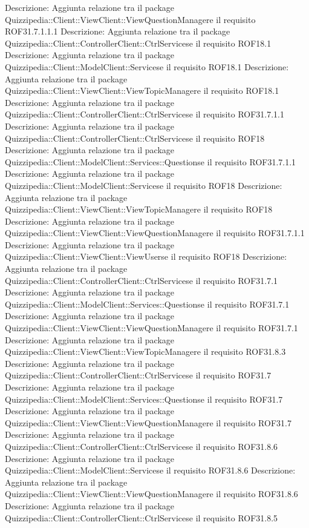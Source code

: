 Descrizione: Aggiunta relazione tra il package Quizzipedia::Client::ViewClient::ViewQuestionManagere il requisito ROF31.7.1.1.1 
Descrizione: Aggiunta relazione tra il package Quizzipedia::Client::ControllerClient::CtrlServicese il requisito ROF18.1 
Descrizione: Aggiunta relazione tra il package Quizzipedia::Client::ModelClient::Servicese il requisito ROF18.1 
Descrizione: Aggiunta relazione tra il package Quizzipedia::Client::ViewClient::ViewTopicManagere il requisito ROF18.1 
Descrizione: Aggiunta relazione tra il package Quizzipedia::Client::ControllerClient::CtrlServicese il requisito ROF31.7.1.1 
Descrizione: Aggiunta relazione tra il package Quizzipedia::Client::ControllerClient::CtrlServicese il requisito ROF18 
Descrizione: Aggiunta relazione tra il package Quizzipedia::Client::ModelClient::Services::Questionse il requisito ROF31.7.1.1 
Descrizione: Aggiunta relazione tra il package Quizzipedia::Client::ModelClient::Servicese il requisito ROF18 
Descrizione: Aggiunta relazione tra il package Quizzipedia::Client::ViewClient::ViewTopicManagere il requisito ROF18 
Descrizione: Aggiunta relazione tra il package Quizzipedia::Client::ViewClient::ViewQuestionManagere il requisito ROF31.7.1.1 
Descrizione: Aggiunta relazione tra il package Quizzipedia::Client::ViewClient::ViewUserse il requisito ROF18 
Descrizione: Aggiunta relazione tra il package Quizzipedia::Client::ControllerClient::CtrlServicese il requisito ROF31.7.1 
Descrizione: Aggiunta relazione tra il package Quizzipedia::Client::ModelClient::Services::Questionse il requisito ROF31.7.1 
Descrizione: Aggiunta relazione tra il package Quizzipedia::Client::ViewClient::ViewQuestionManagere il requisito ROF31.7.1 
Descrizione: Aggiunta relazione tra il package Quizzipedia::Client::ViewClient::ViewTopicManagere il requisito ROF31.8.3 
Descrizione: Aggiunta relazione tra il package Quizzipedia::Client::ControllerClient::CtrlServicese il requisito ROF31.7 
Descrizione: Aggiunta relazione tra il package Quizzipedia::Client::ModelClient::Services::Questionse il requisito ROF31.7 
Descrizione: Aggiunta relazione tra il package Quizzipedia::Client::ViewClient::ViewQuestionManagere il requisito ROF31.7 
Descrizione: Aggiunta relazione tra il package Quizzipedia::Client::ControllerClient::CtrlServicese il requisito ROF31.8.6 
Descrizione: Aggiunta relazione tra il package Quizzipedia::Client::ModelClient::Servicese il requisito ROF31.8.6 
Descrizione: Aggiunta relazione tra il package Quizzipedia::Client::ViewClient::ViewQuestionManagere il requisito ROF31.8.6 
Descrizione: Aggiunta relazione tra il package Quizzipedia::Client::ControllerClient::CtrlServicese il requisito ROF31.8.5 
